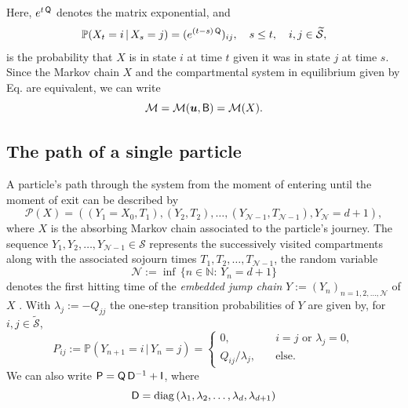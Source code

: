 \documentclass[smallextended]{svjour3}
\makeatletter
\renewcommand*{\eqref}[1]{%
  \hyperref[{#1}]{\textup{\tagform@{\ref*{#1}}}}%
}
\newcommand{\N}{\mathbb{N}}
\renewcommand{\P}{\mathbb{P}}
\newcommand{\diag}{\operatorname{diag}}
\makeatother
\begin{document}
Here, $e^{t\,\mathsf{Q}}$ denotes the matrix exponential, and 
\begin{equation*}
  \P(X_t=i\,|\,X_s=j) = (e^{(t-s)\,\tens{Q}})_{ij},\quad s\leq t,\quad i,j\in\widetilde{\mathcal{S}},
\end{equation*}
is the probability that $X$ is in state $i$ at time $t$ given it was in state $j$ at time $s$.
Since the Markov chain $X$ and the compartmental system in equilibrium given by Eq. \eqref{eqn:lin_CS_sys} are equivalent, we can write
\begin{equation*}
  \mathcal{M}=\mathcal{M}(\vec{u},\tens{B}) = \mathcal{M}(X).
\end{equation*}


\subsection{The path of a single particle}
A particle's path through the system from the moment of entering until the moment of exit can be described by
\begin{equation}
  \label{eqn:path}
  \mathcal{P}(X) = ((Y_1=X_0, T_1),(Y_2,T_2),\ldots,(Y_{\mathcal{N}-1},T_{\mathcal{N}-1}), Y_{\mathcal{N}}=d+1),
\end{equation}
where $X$ is the absorbing Markov chain associated to the particle's journey.
The sequence $Y_1,Y_2,\ldots,Y_{\mathcal{N}-1}\in\mathcal{S}$ represents the successively visited compartments along with the associated sojourn times $T_1,T_2,\ldots,T_{\mathcal{N}-1}$, the random variable
\begin{equation*}
  \mathcal{N}:=\inf\,\{n\in\N:\,Y_n=d+1\}
\end{equation*}
denotes the first hitting time of the \emph{embedded jump chain} $Y:=(Y_n)_{n=1,2,\ldots,\mathcal{N}}$ of $X$ \citep{Norris1997}.
With $\lambda_j:=-Q_{jj}$ the one-step transition probabilities of $Y$ are given by, for $i,j\in\widetilde{\mathcal{S}}$,
\begin{equation}\label{eqn:P_ij}
  P_{ij}:=\P(Y_{n+1}=i\,|\,Y_n=j) = 
  \begin{cases}
    0,\quad & i=j\text{ or }\lambda_j=0,\\
    Q_{ij}/\lambda_j,\quad & \text{else}.
  \end{cases}
\end{equation}
We can also write $\mathsf{P}=\mathsf{Q}\,\mathsf{D}^{-1} + \mathsf{I}$, where
\begin{equation*}
  \tens{D} = \diag\,(\lambda_1,\lambda_2,\ldots,\lambda_d,\lambda_{d+1})
\end{equation*}
\end{document}
